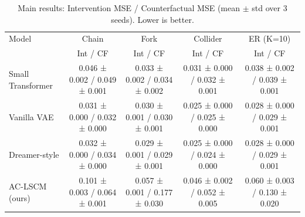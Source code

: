 \begin{table}[h]
\centering
\caption{Main results: Intervention MSE / Counterfactual MSE (mean $\pm$ std over 3 seeds). Lower is better.}
\label{tab:main}
\small
\begin{tabular}{lcccc}
\toprule
Model & Chain & Fork & Collider & ER (K=10) \\
& \small{Int / CF} & \small{Int / CF} & \small{Int / CF} & \small{Int / CF} \\
\midrule
Small Transformer & 0.046 ± 0.002 / 0.049 ± 0.001 & 0.033 ± 0.002 / 0.034 ± 0.002 & 0.031 ± 0.000 / 0.032 ± 0.001 & 0.038 ± 0.002 / 0.039 ± 0.001 \\
Vanilla VAE & 0.031 ± 0.000 / 0.032 ± 0.000 & 0.030 ± 0.001 / 0.030 ± 0.001 & 0.025 ± 0.000 / 0.025 ± 0.000 & 0.028 ± 0.000 / 0.029 ± 0.001 \\
Dreamer-style & 0.032 ± 0.000 / 0.034 ± 0.000 & 0.029 ± 0.001 / 0.029 ± 0.001 & 0.025 ± 0.000 / 0.024 ± 0.000 & 0.028 ± 0.000 / 0.029 ± 0.001 \\
AC-LSCM (ours) & 0.101 ± 0.003 / 0.064 ± 0.001 & 0.057 ± 0.001 / 0.177 ± 0.030 & 0.046 ± 0.002 / 0.052 ± 0.005 & 0.060 ± 0.003 / 0.130 ± 0.020 \\
\bottomrule
\end{tabular}
\end{table}